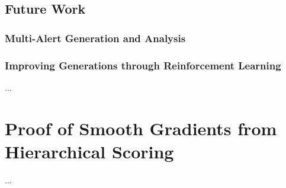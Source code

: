 \documentclass[12pt,american]{report}
\begin{document}
\section{Future Work}

\subsection{Multi-Alert Generation and Analysis}

\subsection{Improving Generations through Reinforcement Learning}

  ...
  \nocite{*}


\begin{singlespace}

\end{singlespace}

\appendix
\chapter{Proof of Smooth Gradients from Hierarchical Scoring}
  ...
\end{document}
